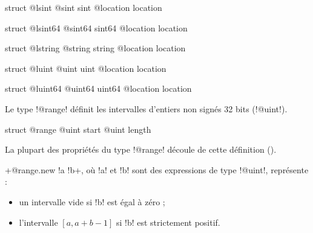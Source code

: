 \begin{galgas}
struct @lsint {
  @sint sint
  @location location
}
\end{galgas}









\begin{galgas}
struct @lsint64 {
  @sint64 sint64
  @location location
}
\end{galgas}








\begin{galgas}
struct @lstring {
  @string string
  @location location
}
\end{galgas}








\begin{galgas}
struct @luint {
  @uint uint
  @location location
}
\end{galgas}







\begin{galgas}
struct @luint64 {
  @uint64 uint64
  @location location
}
\end{galgas}



Le type \ggs!@range! définit les intervalles d'entiers non signés 32 bits (\ggs!@uint!).

\begin{galgas}
struct @range {
  @uint start
  @uint length
}
\end{galgas}

La plupart des propriétés du type \ggs!@range! découle de cette définition ().

\ggs+@range.new {!a !b}+, où \ggs!a! et \ggs!b! sont des expressions de type \ggs!@uint!, représente :
\begin{itemize}
  \item un intervalle vide si \ggs!b! est égal à zéro ;
  \item l'intervalle $[a, a+b-1]$ si \ggs!b! est strictement positif.
\end{itemize}



